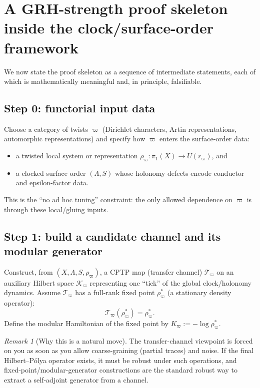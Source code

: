 \documentclass[11pt,oneside]{amsbook}
\numberwithin{equation}{section}
\theoremstyle{plain}
\theoremstyle{definition}
\theoremstyle{remark}
\newtheorem{remark}[theorem]{Remark}
\begin{document}
\section{A GRH-strength proof skeleton inside the clock/surface-order framework}
\label{sec:hp_proof_skeleton}

We now state the proof skeleton as a sequence of intermediate statements, each of which is mathematically meaningful and, in principle, falsifiable.

\subsection{Step 0: functorial input data}
Choose a category of twists $\varpi$ (Dirichlet characters, Artin representations, automorphic representations) and specify how $\varpi$ enters the surface-order data:
\begin{itemize}
\item a twisted local system or representation $\rho_\varpi:\pi_1(X)\to U(r_\varpi)$, and
\item a clocked surface order $(\Lambda,S)$ whose holonomy defects encode conductor and epsilon-factor data.
\end{itemize}
This is the ``no ad hoc tuning'' constraint: the only allowed dependence on $\varpi$ is through these local/gluing inputs.

\subsection{Step 1: build a candidate channel and its modular generator}
Construct, from $(X,\Lambda,S,\rho_\varpi)$, a CPTP map (transfer channel) $\mathcal{T}_\varpi$ on an auxiliary Hilbert space $\mathcal{K}_\varpi$ representing one ``tick'' of the global clock/holonomy dynamics.
Assume $\mathcal{T}_\varpi$ has a full-rank fixed point $\rho_\varpi^\ast$ (a stationary density operator):
\[
\mathcal{T}_\varpi(\rho_\varpi^\ast)=\rho_\varpi^\ast.
\]
Define the modular Hamiltonian of the fixed point by $K_\varpi:=-\log\rho_\varpi^\ast$.

\begin{remark}[Why this is a natural move]
The transfer-channel viewpoint is forced on you as soon as you allow coarse-graining (partial traces) and noise.
If the final Hilbert--Pólya operator exists, it must be robust under such operations, and fixed-point/modular-generator constructions are the standard robust way to extract a self-adjoint generator from a channel.
\end{remark}
\end{document}
